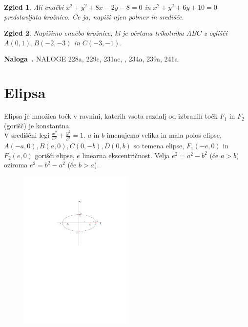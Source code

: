 \documentclass{article}
\newcounter{example}%
\newenvironment{example}[1][]{\refstepcounter{example}\par\medskip
   \noindent \textbf{Naloga~\theexample. #1} \rmfamily}{\medskip}
\newtheorem*{zgled}{Zgled}
\begin{document}

\begin{zgled}
    Ali enačbi $x^2+y^2+8x-2y-8=0$ in $x^2+y^2+6y+10=0$ predstavljata krožnico. Če ja, napiši njen polmer in središče.
\end{zgled}

\begin{zgled}
    Napišimo enačbo krožnice, ki je očrtana trikotniku $ABC$ z oglišči $A(0,1), B(-2,-3)$ in $C(-3,-1)$.
\end{zgled}

\begin{example}
    NALOGE 228a, 229c, 231ac, , 234a, 239a, 241a.
\end{example}

\section{Elipsa}

Elipsa je množica točk v ravnini, katerih vsota razdalj od izbranih točk $F_1$ in $F_2$ (gorišč) je konstantna.\\

V središčni legi $\frac{x^2}{a^2}+\frac{y^2}{b^2}=1$. $a$ in $b$ imenujemo velika in mala polos elipse, $A(-a,0),B(a,0),C(0,-b),D(0,b)$ so temena elipse, $F_1(-e,0)$ in $F_2(e,0)$ gorišči elipse, $e$ linearna ekscentričnost. Velja $e^2=a^2-b^2$ (če $a>b$) oziroma $e^2=b^2-a^2$ (če $b>a$).

\begin{figure}[H]
\includegraphics[width=0.5\textwidth]{stoznice.elipsa.pdf}
\centering
\end{figure}
\end{document}
